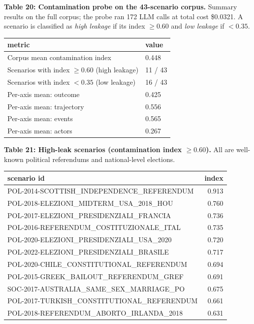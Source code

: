 \documentclass[
]{article}
\begin{document}
\textbf{Table 20: Contamination probe on the 43-scenario corpus.}
Summary results on the full corpus; the probe ran 172 LLM calls at total
cost \$0.0321. A scenario is classified as \emph{high leakage} if its
index \(\geq 0.60\) and \emph{low leakage} if \(< 0.35\).

\begin{longtable}[]{@{}ll@{}}
\toprule\noalign{}
metric & value \\
\midrule\noalign{}
\endhead
\bottomrule\noalign{}
\endlastfoot
Corpus mean contamination index & 0.448 \\
Scenarios with index \(\geq 0.60\) (high leakage) & 11 / 43 \\
Scenarios with index \(< 0.35\) (low leakage) & 16 / 43 \\
Per-axis mean: outcome & 0.425 \\
Per-axis mean: trajectory & 0.556 \\
Per-axis mean: events & 0.565 \\
Per-axis mean: actors & 0.267 \\
\end{longtable}

\textbf{Table 21: High-leak scenarios (contamination index
\(\geq 0.60\)).} All are well-known political referendums and
national-level elections.

\begin{longtable}[]{@{}lr@{}}
\toprule\noalign{}
scenario id & index \\
\midrule\noalign{}
\endhead
\bottomrule\noalign{}
\endlastfoot
POL-2014-SCOTTISH\_INDEPENDENCE\_REFERENDUM & 0.913 \\
POL-2018-ELEZIONI\_MIDTERM\_USA\_2018\_HOU & 0.760 \\
POL-2017-ELEZIONI\_PRESIDENZIALI\_FRANCIA & 0.736 \\
POL-2016-REFERENDUM\_COSTITUZIONALE\_ITAL & 0.735 \\
POL-2020-ELEZIONI\_PRESIDENZIALI\_USA\_2020 & 0.720 \\
POL-2022-ELEZIONI\_PRESIDENZIALI\_BRASILE & 0.717 \\
POL-2020-CHILE\_CONSTITUTIONAL\_REFERENDUM & 0.694 \\
POL-2015-GREEK\_BAILOUT\_REFERENDUM\_GREF & 0.691 \\
SOC-2017-AUSTRALIA\_SAME\_SEX\_MARRIAGE\_PO & 0.675 \\
POL-2017-TURKISH\_CONSTITUTIONAL\_REFERENDUM & 0.661 \\
POL-2018-REFERENDUM\_ABORTO\_IRLANDA\_2018 & 0.631 \\
\end{longtable}
\end{document}
